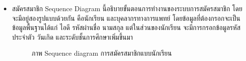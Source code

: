 \documentclass[12pt,oneside,openright,a4paper]{cpe-thai-project}
\begin{document}
\begin{itemize}
\begin{table}[!h]
\begin{tabular}{|p{4cm}|p{10cm}|}
        \end{tabular}
        \end{table}
        \newpage
        \item สมัครสมาชิก
        Sequence Diagram นี้อธิบายขั้นตอนการทำงานของระบบการสมัครสมาชิก โดยจะมีอยู่สองรูปแบบด้วยกัน คือนักเรียน และบุคลากรทางการแพทย์ 
        โดยข้อมูลที่ต้องกรอกจะเป็นข้อมูลพื้นฐานได้แก่ ไอดี รหัสผ่านชื่อ นามสกุล แต่ในส่วนของนักเรียน จะมีการกรอกข้อมูลรหัสประจำตัว วันเกิด และระดับชั้นการศึกษาเพิ่มขึ้นมา
        \newpage
        \begin{figure}[!ht]\centering
          \setlength{\fboxrule}{0.2mm} %
          \setlength{\fboxsep}{1cm}
          \caption{ภาพ Sequence diagram การสมัครสมาชิกแบบนักเรียน}\label{fig:activity6}

\end{figure}
\end{itemize}
\end{document}
